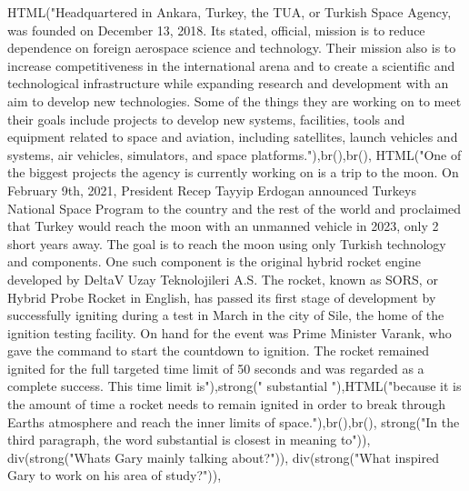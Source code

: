 \documentclass[
]{article}
\newenvironment{Shaded}{\begin{snugshade}}{\end{snugshade}}
\newcommand{\FunctionTok}[1]{\textcolor[rgb]{0.00,0.00,0.00}{#1}}
\newcommand{\NormalTok}[1]{#1}
\newcommand{\StringTok}[1]{\textcolor[rgb]{0.31,0.60,0.02}{#1}}
\begin{document}
\begin{Shaded}
\begin{Highlighting}[]
               \FunctionTok{HTML}\NormalTok{(}\StringTok{"Headquartered in Ankara, Turkey, the TUA, or Turkish Space Agency, was founded on December 13, 2018. Its stated, official, mission is to reduce dependence on foreign aerospace science and technology. Their mission also is to increase competitiveness in the international arena and to create a scientific and technological infrastructure while expanding research and development with an aim to develop new technologies. Some of the things they are working on to meet their goals include projects to develop new systems, facilities, tools and equipment related to space and aviation, including satellites, launch vehicles and systems, air vehicles, simulators, and space platforms."}\NormalTok{),}\FunctionTok{br}\NormalTok{(),}\FunctionTok{br}\NormalTok{(),}
               \FunctionTok{HTML}\NormalTok{(}\StringTok{"One of the biggest projects the agency is currently working on is a trip to the moon. On February 9th, 2021, President Recep Tayyip Erdogan announced Turkey\textquotesingle{}s National Space Program to the country and the rest of the world and proclaimed that Turkey would reach the moon with an unmanned vehicle in 2023, only 2 short years away. The goal is to reach the moon using only Turkish technology and components. One such component is the original hybrid rocket engine developed by DeltaV Uzay Teknolojileri A.S. The rocket, known as SORS, or Hybrid Probe Rocket in English, has passed its first stage of development by successfully igniting during a test in March in the city of Sile, the home of the ignition testing facility. On hand for the event was Prime Minister Varank, who gave the command to start the countdown to ignition. The rocket remained ignited for the full targeted time limit of 50 seconds and was regarded as a complete success. This time limit is"}\NormalTok{),}\FunctionTok{strong}\NormalTok{(}\StringTok{" substantial "}\NormalTok{),}\FunctionTok{HTML}\NormalTok{(}\StringTok{"because it is the amount of time a rocket needs to remain ignited in order to break through Earths atmosphere and reach the inner limits of space."}\NormalTok{),}\FunctionTok{br}\NormalTok{(),}\FunctionTok{br}\NormalTok{(),}
               \FunctionTok{strong}\NormalTok{(}\StringTok{"In the third paragraph, the word substantial is closest in meaning to"}\NormalTok{)),}
           \FunctionTok{div}\NormalTok{(}\FunctionTok{strong}\NormalTok{(}\StringTok{"Whats Gary mainly talking about?"}\NormalTok{)),}
           \FunctionTok{div}\NormalTok{(}\FunctionTok{strong}\NormalTok{(}\StringTok{"What inspired Gary to work on his area of study?"}\NormalTok{)),}

\end{Highlighting}
\end{Shaded}
\end{document}
